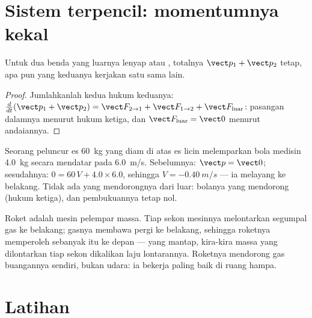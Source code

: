 \section{Sistem terpencil: momentumnya kekal}

\begin{proposition}\label{prop:g12:newtons-laws:conservation}
Untuk dua benda yang  luarnya lenyap atau ,  totalnya
$\vect p_1 + \vect p_2$ tetap, apa pun  yang keduanya kerjakan satu sama lain.
\end{proposition}

\begin{proof}
Jumlahkanlah kedua hukum keduanya: $\frac{d}{dt}(\vect p_1 + \vect p_2) = \vect F_{2 \to 1} +
\vect F_{1 \to 2} + \vect F_{\text{luar}}$: pasangan dalamnya 
menurut hukum ketiga, dan $\vect F_{\text{luar}} = \vect 0$ menurut andaiannya.
\end{proof}

\begin{example}\label{ex:g12:newtons-laws:recoil}
Seorang peluncur es \qty{60}{kg} yang diam di atas es licin melemparkan bola medisin
\qty{4.0}{kg} secara mendatar pada \qty{6.0}{m/s}. Sebelumnya: $\vect p = \vect 0$;
sesudahnya: $0 = 60\,V + 4.0 \times 6.0$, sehingga $V = \qty{-0.40}{m/s}$ --- ia
melayang ke belakang. Tidak ada yang mendorongnya dari luar: bolanya yang mendorong
(hukum ketiga), dan pembukuannya tetap nol.
\end{example}

\begin{remark}\label{rem:g12:newtons-laws:rocket}
Roket adalah mesin pelempar massa. Tiap sekon mesinnya melontarkan segumpal gas ke
belakang; gasnya membawa pergi  ke belakang, sehingga roketnya memperoleh
sebanyak itu ke depan ---  yang mantap, kira-kira massa yang dilontarkan
tiap sekon dikalikan laju lontarannya. Roketnya mendorong gas buangannya sendiri,
bukan udara: ia bekerja paling baik di ruang hampa.
\end{remark}

\section{Latihan}

